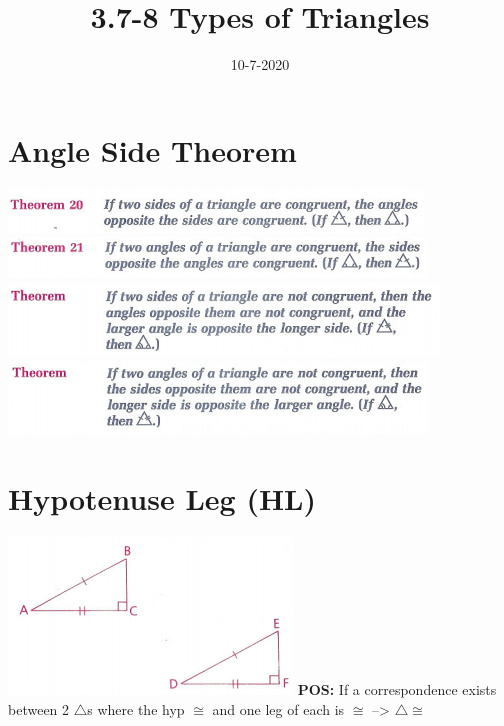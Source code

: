 \documentclass{article}
\begin{document}
	
	\setlength{\droptitle}{-5em}
	\title{3.7-8 Types of Triangles}
	\date{10-7-2020}
	\author{}
	\maketitle
	
	\section{Angle Side Theorem}
	\includegraphics[scale=0.8]{pics/T20.png}
	\newline \newline
	\includegraphics[scale=0.8]{pics/T21.png}
	\newline \newline
	\includegraphics[scale=0.8]{pics/T21a.png}
	\newline \newline
	\includegraphics[scale=0.8]{pics/T21b.png}
	\newline \newline
	
	\section{Hypotenuse Leg (HL)}
	\includegraphics[scale=0.8]{pics/HL.png}
	\newline
	\textbf{POS: }If a correspondence exists between 2 $\triangle$s where the hyp $\cong$ and one leg of each is $\cong$ --> $\triangle \cong$
\end{document}
